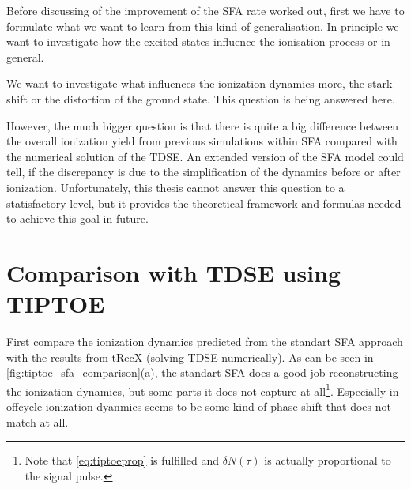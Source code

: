 Before discussing of the improvement of the SFA rate worked out, first we have to formulate what we want to learn from this kind of generalisation. 
In principle we want to investigate how the excited states influence the ionisation process or in general.

We want to investigate what influences the ionization dynamics more, the stark shift or the distortion of the ground state.
This question is being answered here.

However, the much bigger question is that there is quite a big difference between the overall ionization yield from previous simulations within SFA compared with the numerical solution of the TDSE.
An extended version of the SFA model could tell, if the discrepancy is due to the simplification of the dynamics before or after ionization.
Unfortunately, this thesis cannot answer this question to a statisfactory level, but it provides the theoretical framework and formulas needed to achieve this goal in future.





\section{Comparison with TDSE using TIPTOE}
First compare the ionization dynamics predicted from the standart SFA approach \cite{Theory_NPS} with the results from tRecX (solving TDSE numerically).
As can be seen in \ref{fig:tiptoe_sfa_comparison}(a), the standart SFA does a good job reconstructing the ionization dynamics, but some parts it does not capture at all\footnote{Note that \eqref{eq:tiptoeprop} is fulfilled and $\delta N(\tau)$ is actually proportional to the signal pulse.}.
Especially in offcycle ionization dyanmics seems to be some kind of phase shift that does not match at all. 


